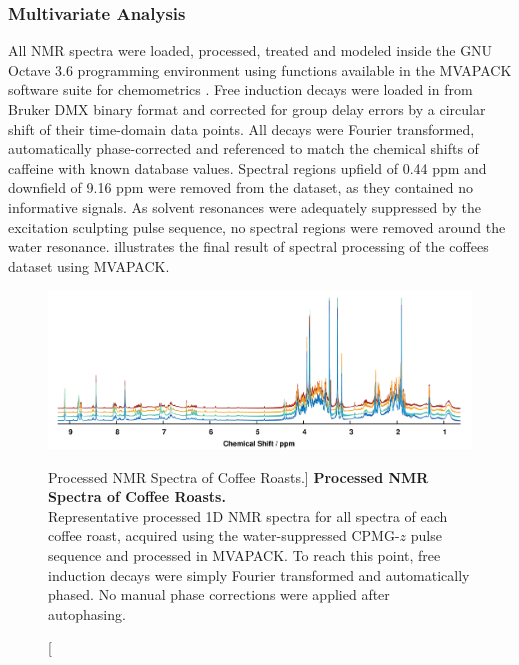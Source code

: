 \subsubsection{Multivariate Analysis}

\begin{doublespace}
All NMR spectra were loaded, processed, treated and modeled inside the GNU
Octave 3.6 programming environment \cite{eaton2008} using functions available
in the MVAPACK software suite for chemometrics \cite{worley:acscb2014}.
Free induction decays were loaded in from Bruker DMX binary format and
corrected for group delay errors by a circular shift of their time-domain
data points. All decays were Fourier transformed, automatically phase-corrected
and referenced to match the chemical shifts of caffeine with known database
values. Spectral regions upfield of 0.44 ppm and downfield of 9.16 ppm were
removed from the dataset, as they contained no informative signals. As solvent
resonances were adequately suppressed by the excitation sculpting pulse
sequence, no spectral regions were removed around the water resonance.
 illustrates the final result of spectral processing
of the coffees dataset using MVAPACK.
\end{doublespace}

\begin{figure}[ht!]
\includegraphics[width=6.5in]{figs/apps/02-spectra.png}
\caption
      [Processed \hnmr{} NMR Spectra of Coffee Roasts.]{
  {\bf Processed \hnmr{} NMR Spectra of Coffee Roasts.}
  \\
  Representative processed 1D \hnmr{} NMR spectra for all spectra of each
  coffee roast, acquired using the water-suppressed CPMG-$z$ pulse sequence
  and processed in MVAPACK. To reach this point, free induction decays were
  simply Fourier transformed and automatically phased. No manual phase
  corrections were applied after autophasing.
}
\label{figure.4.2}
\end{figure}


